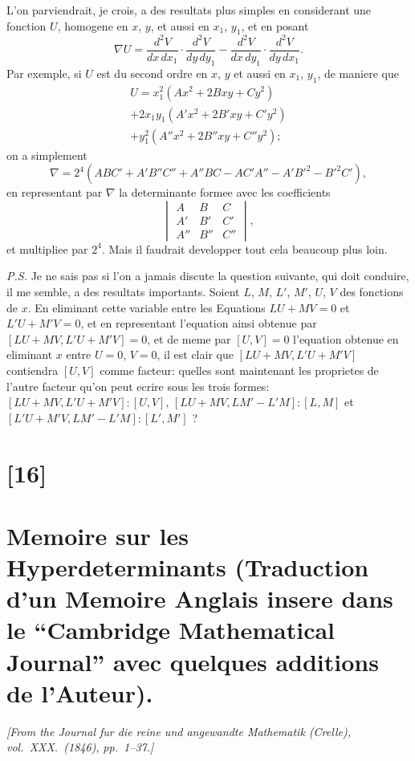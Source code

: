 \documentclass[11pt,a4paper]{book}
\begin{document}
L'on parviendrait, je crois, a des resultats plus simples en considerant une fonction
$U$, homogene en $x$, $y$, et aussi en $x_1$, $y_1$, et en posant
\[
\nabla U = \frac{d^2V}{dx\,dx_1} \cdot \frac{d^2V}{dy\,dy_1}
- \frac{d^2V}{dx\,dy_1} \cdot \frac{d^2V}{dy\,dx_1}.
\]
Par exemple, si $U$ est du second ordre en $x$, $y$ et aussi en $x_1$, $y_1$, de maniere que
\begin{multline*}
U = x_1^2 (Ax^2 + 2Bxy + Cy^2) \\
+ 2x_1y_1 (A'x^2 + 2B'xy + C'y^2) \\
+ y_1^2 (A''x^2 + 2B''xy + C''y^2);
\end{multline*}
on a simplement
\[
\nabla = 2^4 (ABC' + A'B''C'' + A''BC - AC'A'' - A'B'^2 - B'^2C'),
\]
en representant par $\nabla$ la determinante formee avec les coefficients
\[
\begin{vmatrix}
A & B & C\\
A' & B' & C'\\
A'' & B'' & C''
\end{vmatrix},
\]
et multipliee par $2^4$. Mais il faudrait developper tout cela beaucoup plus loin.

\medskip
\textit{P.S.} Je ne sais pas si l'on a jamais discute la question suivante, qui doit conduire,
il me semble, a des resultats importants. Soient $L$, $M$, $L'$, $M'$, $U$, $V$ des fonctions
de $x$. En eliminant cette variable entre les Equations $LU + MV = 0$ et $L'U + M'V = 0$,
et en representant l'equation ainsi obtenue par $[LU + MV, L'U + M'V] = 0$, et
de meme par $[U, V] = 0$ l'equation obtenue en eliminant $x$ entre $U = 0$, $V = 0$,
il est clair que $[LU + MV, L'U + M'V]$ contiendra $[U, V]$ comme facteur: quelles
sont maintenant les proprietes de l'autre facteur qu'on peut ecrire sous les trois
formes: $[LU + MV, L'U + M'V] : [U, V]$, $[LU + MV, LM' - L'M] : [L, M]$ et
$[L'U + M'V, LM'-L'M] : [L', M']$ ?

\newpage
\section*{[16]}
\section*{Memoire sur les Hyperdeterminants (Traduction d'un Memoire Anglais insere dans le ``Cambridge Mathematical Journal'' avec quelques additions de l'Auteur).}

\textit{[From the Journal fur die reine und angewandte Mathematik (Crelle), vol.~XXX.~(1846),}
\textit{pp.~1--37.]}
\end{document}
